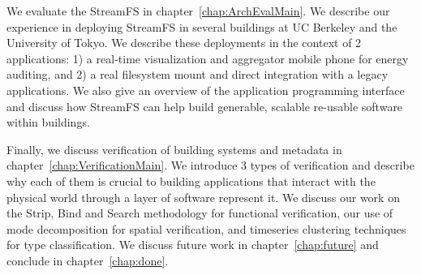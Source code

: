 We evaluate the StreamFS in chapter~\ref{chap:ArchEvalMain}.  We describe our experience in deploying StreamFS in several buildings
at UC Berkeley and the University of Tokyo.  We describe these deployments in the context of 2 applications: 1) a real-time visualization and 
aggregator mobile phone for energy auditing, and  2) a real filesystem mount and direct integration with a legacy applications. 
We also give an overview of the application programming interface and discuss how StreamFS can help build generable, scalable 
re-usable software within buildings.

Finally, we discuss verification of building systems and metadata in chapter~\ref{chap:VerificationMain}.  We introduce 3 types of 
verification and describe why each of them is crucial to building applications that interact with the physical world through
a layer of software represent it.  We discuss our work on the Strip, Bind and Search methodology for functional verification, 
our use of mode decomposition for spatial verification, and timeseries clustering techniques for type classification.  
We discuss future work in chapter~\ref{chap:future} and conclude in chapter~\ref{chap:done}.



























